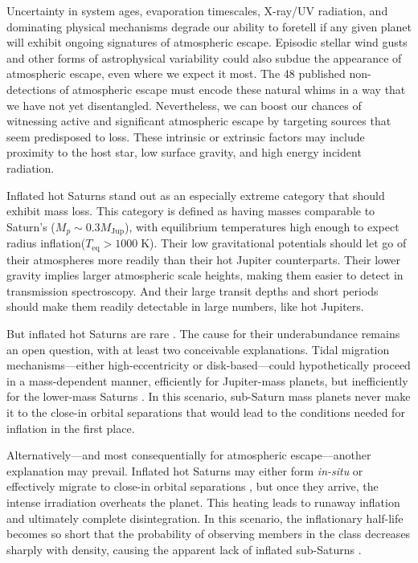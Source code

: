 \documentclass[twocolumn]{aastex631}
\begin{document}
Uncertainty in system ages, evaporation timescales, X-ray/UV radiation, and dominating physical mechanisms degrade our ability to foretell if any given planet will exhibit ongoing signatures of atmospheric escape.  Episodic stellar wind gusts and other forms of astrophysical variability could also subdue the appearance of atmospheric escape, even where we expect it most.  The 48 published non-detections of atmospheric escape \citep{2022arXiv221116243D} must encode these natural whims in a way that we have not yet disentangled. Nevertheless, we can boost our chances of witnessing active and significant atmospheric escape by targeting sources that seem predisposed to loss.  These intrinsic or extrinsic factors may include proximity to the host star, low surface gravity, and high energy incident radiation.

Inflated hot Saturns stand out as an especially extreme category that should exhibit mass loss.  This category is defined as having masses comparable to Saturn's ($M_p \sim 0.3 M_\mathrm{Jup}$), with equilibrium temperatures high enough to expect radius inflation($T_\mathrm{eq}>1000\;$K).  Their low gravitational potentials should let go of their atmospheres more readily than their hot Jupiter counterparts.  Their lower gravity implies larger atmospheric scale heights, making them easier to detect in transmission spectroscopy.  And their large transit depths and short periods should make them readily detectable in large numbers, like hot Jupiters.

But inflated hot Saturns are rare \citep{2018AJ....155..214T}.  The cause for their underabundance remains an open question, with at least two conceivable explanations.  Tidal migration mechanisms---either high-eccentricity or disk-based---could hypothetically proceed in a mass-dependent manner, efficiently for Jupiter-mass planets, but inefficiently for the lower-mass Saturns \citep{2018AJ....155..214T,2018ARA&A..56..175D}.  In this scenario, sub-Saturn mass planets never make it to the close-in orbital separations that would lead to the conditions needed for inflation in the first place.

Alternatively---and most consequentially for atmospheric escape---another explanation may prevail.  Inflated hot Saturns may either form \emph{in-situ} or effectively migrate to close-in orbital separations \citep{2018ARA&A..56..175D}, but once they arrive, the intense irradiation overheats the planet.  This heating leads to runaway inflation and ultimately complete disintegration.  In this scenario, the inflationary half-life becomes so short that the probability of observing members in the class decreases sharply with density, causing the apparent lack of inflated sub-Saturns \citep{2023ApJ...945L..36T}.
\end{document}
